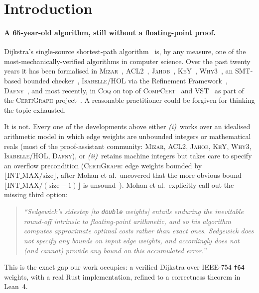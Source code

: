 \documentclass[11pt,a4paper]{article}
\newcommand{\Lean}{Lean~4\xspace}
\newcommand{\Dijkstra}{Dijkstra\xspace}
\newcommand{\code}[1]{\texttt{#1}}
\theoremstyle{plain}
\theoremstyle{definition}
\begin{document}
\section{Introduction}\label{sec:introduction}

\paragraph*{A 65-year-old algorithm, still without a floating-point proof.}
\Dijkstra's single-source shortest-path algorithm~\cite{Dijkstra1959} is, by
any measure, one of the most-mechanically-verified algorithms in
computer science. Over the past twenty years it has been formalised in
\textsc{Mizar}~\cite{Chen2003}, \textsc{ACL2}~\cite{MooreZhang2005},
\textsc{Jahob}~\cite{MangeKuhn2007}, \textsc{KeY}~\cite{Klasen2010},
\textsc{Why3}~\cite{Filliatre2011Toccata}, an SMT-based bounded
checker~\cite{LiuNagelTaghdiri2012}, \textsc{Isabelle/HOL} via the Refinement
Framework~\cite{NordhoffLammich2012,LammichNipkow2019},
\textsc{Dafny}~\cite{Leino2023ProgramProofs}, and most recently, in
\textsc{Coq} on top of \textsc{CompCert}~\cite{Leroy2009CompCert} and
\textsc{VST}~\cite{AppelVST2011} as part of the \textsc{CertiGraph}
project~\cite{WangCaoMohanHobor2019,MohanLeowHobor2021}. A reasonable
practitioner could be forgiven for thinking the topic exhausted.

It is not. Every one of the developments above either
\emph{(i)}~works over an idealised arithmetic model in which edge weights are
unbounded integers or mathematical reals (most of the proof-assistant
community: \textsc{Mizar}, \textsc{ACL2}, \textsc{Jahob}, \textsc{KeY},
\textsc{Why3}, \textsc{Isabelle/HOL}, \textsc{Dafny}), or
\emph{(ii)}~retains machine integers but takes care to specify an
overflow precondition (\textsc{CertiGraph}: edge weights bounded by
$\lfloor \mathrm{INT\_MAX}/\mathrm{size} \rfloor$, after Mohan et al.\ uncovered
that the more obvious bound $\lfloor \mathrm{INT\_MAX}/(\mathrm{size}-1)\rfloor$
is unsound~\cite[\S 3.2]{MohanLeowHobor2021}). Mohan et al.\ explicitly call
out the missing third option:
\begin{quote}
\itshape``Sedgewick's sidestep [to \code{double} weights] entails enduring
the inevitable round-off intrinsic to floating-point arithmetic, and so his
algorithm computes approximate optimal costs rather than exact ones.
Sedgewick does not specify any bounds on input edge weights, and accordingly
does not (and cannot) provide any bound on this accumulated
error.''~\cite[\S 3.3]{MohanLeowHobor2021}
\end{quote}
This is the exact gap our work occupies: a verified \Dijkstra{} over
IEEE-754 \code{f64} weights, with a real Rust implementation, refined to a
correctness theorem in \Lean.
\end{document}
